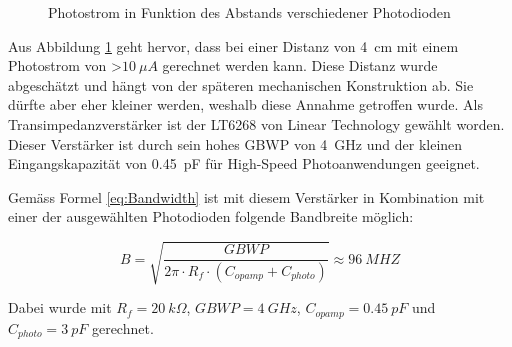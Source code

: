 \begin{figure}[h]
\centering
{}
\caption{Photostrom in Funktion des Abstands verschiedener Photodioden}\label{fig:Plot_Photo}
\end{figure}

Aus Abbildung \ref{fig:Plot_Photo} geht hervor, dass bei einer Distanz von \SI{4}{cm} mit einem Photostrom von \textgreater $\SI{10}{\mu A}$ gerechnet werden kann. Diese Distanz wurde abgeschätzt und hängt von der späteren mechanischen Konstruktion ab. Sie dürfte aber eher kleiner werden, weshalb diese Annahme getroffen wurde.
\newline
Als Transimpedanzverstärker ist der LT6268 von Linear Technology gewählt worden. Dieser Verstärker ist durch sein hohes GBWP von \SI{4}{GHz} und der kleinen Eingangskapazität von \SI{0.45}{pF} für High-Speed Photoanwendungen geeignet.

Gemäss Formel \ref{eq:Bandwidth} ist mit diesem Verstärker in Kombination mit einer der ausgewählten Photodioden folgende Bandbreite möglich:

\begin{equation}\label{eq:Bandwidth2}
B=\sqrt{\frac{GBWP}{2\pi\cdot R_{f}\cdot (C_{opamp}+C_{photo})}}\approx \SI{96}{MHZ}
\end{equation}

Dabei wurde mit $R_{f}=\SI{20}{k\Omega}$, $GBWP=\SI{4}{GHz}$, $C_{opamp}=\SI{0.45}{pF}$ und $C_{photo}=\SI{3}{pF}$ gerechnet.


